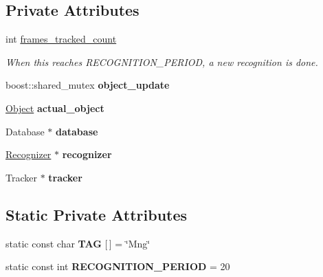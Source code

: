 \subsection*{Private Attributes}
\begin{DoxyCompactItemize}
\item 
\hypertarget{class_i_stuff_1_1_manager_a3cacb02ece1a4938e7754ad553c91a74}{int \hyperlink{class_i_stuff_1_1_manager_a3cacb02ece1a4938e7754ad553c91a74}{frames\-\_\-tracked\-\_\-count}}\label{class_i_stuff_1_1_manager_a3cacb02ece1a4938e7754ad553c91a74}

\begin{DoxyCompactList}\small\item\em When this reaches R\-E\-C\-O\-G\-N\-I\-T\-I\-O\-N\-\_\-\-P\-E\-R\-I\-O\-D, a new recognition is done. \end{DoxyCompactList}\item 
\hypertarget{class_i_stuff_1_1_manager_a9b4234320a01a049bc10f9f13d612fc4}{boost\-::shared\-\_\-mutex {\bfseries object\-\_\-update}}\label{class_i_stuff_1_1_manager_a9b4234320a01a049bc10f9f13d612fc4}

\item 
\hypertarget{class_i_stuff_1_1_manager_a9b898107c919a3ba73f60278c9c05742}{\hyperlink{class_i_stuff_1_1_object}{Object} {\bfseries actual\-\_\-object}}\label{class_i_stuff_1_1_manager_a9b898107c919a3ba73f60278c9c05742}

\item 
\hypertarget{class_i_stuff_1_1_manager_aae57c3ee778cb782dc8dc954a6667c73}{Database $\ast$ {\bfseries database}}\label{class_i_stuff_1_1_manager_aae57c3ee778cb782dc8dc954a6667c73}

\item 
\hypertarget{class_i_stuff_1_1_manager_a8debd3deef96a862ed16ab3387e10d73}{\hyperlink{class_i_stuff_1_1_recognizer}{Recognizer} $\ast$ {\bfseries recognizer}}\label{class_i_stuff_1_1_manager_a8debd3deef96a862ed16ab3387e10d73}

\item 
\hypertarget{class_i_stuff_1_1_manager_a6195abc0b414c5c8ee52415e394a8360}{Tracker $\ast$ {\bfseries tracker}}\label{class_i_stuff_1_1_manager_a6195abc0b414c5c8ee52415e394a8360}

\end{DoxyCompactItemize}
\subsection*{Static Private Attributes}
\begin{DoxyCompactItemize}
\item 
\hypertarget{class_i_stuff_1_1_manager_a0228682f317a86ce7057b86e9d229ac6}{static const char {\bfseries T\-A\-G} \mbox{[}$\,$\mbox{]} = \char`\"{}Mng\char`\"{}}\label{class_i_stuff_1_1_manager_a0228682f317a86ce7057b86e9d229ac6}

\item 
\hypertarget{class_i_stuff_1_1_manager_a58f0beb39eea21e78a8983e5954065c3}{static const int {\bfseries R\-E\-C\-O\-G\-N\-I\-T\-I\-O\-N\-\_\-\-P\-E\-R\-I\-O\-D} = 20}\label{class_i_stuff_1_1_manager_a58f0beb39eea21e78a8983e5954065c3}

\end{DoxyCompactItemize}


